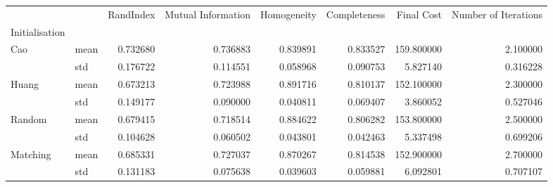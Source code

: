 \begin{tabular}{llrrrrrr}
\toprule
    &      &  RandIndex &  Mutual Information &  Homogeneity &  Completeness &  Final Cost &  Number of Iterations \\
Initialisation & {} &            &                     &              &               &             &                       \\
\midrule
Cao & mean &   0.732680 &            0.736883 &     0.839891 &      0.833527 &  159.800000 &              2.100000 \\
    & std &   0.176722 &            0.114551 &     0.058968 &      0.090753 &    5.827140 &              0.316228 \\
Huang & mean &   0.673213 &            0.723988 &     0.891716 &      0.810137 &  152.100000 &              2.300000 \\
    & std &   0.149177 &            0.090000 &     0.040811 &      0.069407 &    3.860052 &              0.527046 \\
Random & mean &   0.679415 &            0.718514 &     0.884622 &      0.806282 &  153.800000 &              2.500000 \\
    & std &   0.104628 &            0.060502 &     0.043801 &      0.042463 &    5.337498 &              0.699206 \\
Matching & mean &   0.685331 &            0.727037 &     0.870267 &      0.814538 &  152.900000 &              2.700000 \\
    & std &   0.131183 &            0.075638 &     0.039603 &      0.059881 &    6.092801 &              0.707107 \\
\bottomrule
\end{tabular}
